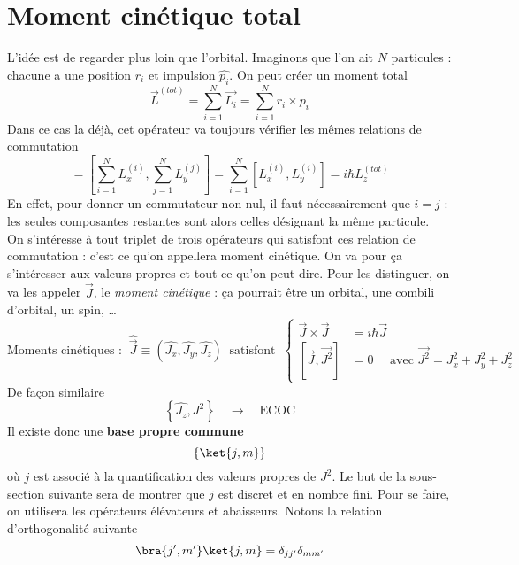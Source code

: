 \section{Moment cinétique total}
L'idée est de regarder plus loin que l'orbital. Imaginons que l'on ait $N$ particules : 
chacune a une position $\hat{r_i}$ et impulsion $\hat{p_i}$. On peut créer un moment total
\begin{equation}
\vec{L}^{(tot)} = \sum_{i=1}^N \vec{L_i} = \sum_{i=1}^N r_i\times p_i
\end{equation}
Dans ce cas la déjà, cet opérateur va toujours vérifier les mêmes relations de 
commutation
\begin{equation}
[L^{(tot)}_x,L^{(tot)}_y] = \left[ \sum_{i=1}^N L_x^{(i)}, \sum_{j=1}^N L_y^{(j)}\right] 
= \sum_{i=1}^N[L_x^{(i)},L_y^{(i)}] = i\hbar L_z^{(tot)}
\end{equation}
En effet, pour donner un commutateur non-nul, il faut nécessairement que $i=j$ : les seules 
composantes restantes sont alors celles désignant la même particule.\\


On s’intéresse à tout triplet de trois opérateurs qui satisfont ces relation 
de commutation : c'est ce qu'on appellera moment cinétique. On va pour ça 
s'intéresser aux valeurs propres et tout ce qu'on peut dire. Pour les distinguer, 
on va les appeler $\vec J$, le \textit{moment cinétique} : ça pourrait être un orbital, une 
combili d'orbital, un spin, \dots
\begin{equation}
\text{Moments cinétiques : }\ \hat{\vec{J}} \equiv (\hat{J_x},\hat{J_y},\hat{J_z})\ \text{ satisfont }\ 
\left\{\begin{array}{ll}
\vec{J}\times\vec{J} &= i\hbar\vec{J}\\
\left[\vec{J},\vec{J^2}\right] &= 0\quad \text{ avec } \vec{J^2}=J_x^2+J_y^2+J_z^2
\end{array}\right.
\end{equation}
De 	façon similaire
\begin{equation}
\left\{\hat{J_z}, J^2\right\}\quad\rightarrow\quad \text{ECOC}
\end{equation}
Il existe donc une \textbf{base propre commune}
\begin{equation}
\left\{\ket{j,m}\right\}	
\end{equation}
où $j$ est associé à la quantification des valeurs propres de $J^2$. Le but de la sous-section 
suivante sera de montrer que $j$ est discret et en nombre fini. Pour se faire, on utilisera les 
opérateurs élévateurs et abaisseurs. Notons la relation d'orthogonalité
suivante
\begin{equation}
\bra{j',m'}\ket{j,m} = \delta_{jj'}\delta_{mm'}
\end{equation}

